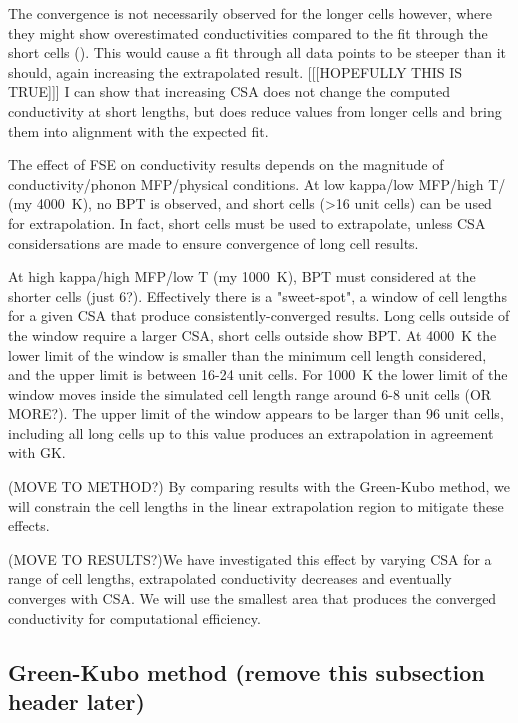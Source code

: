 \documentclass[%
preprint,                                  %
nofootinbib,
 amsmath,amssymb,
 aps,
]{revtex4-1}
\begin{document}
The convergence is not necessarily observed for the longer cells however, where they might show overestimated conductivities compared to the fit through the short cells (\cite{Hu2011}). This would cause a fit through all data points to be steeper than it should, again increasing the extrapolated result.  [[[HOPEFULLY THIS IS TRUE]]] I can show that increasing CSA does not change the computed conductivity at short lengths, but does reduce values from longer cells and bring them into alignment with the expected fit.

The effect of FSE on conductivity results depends on the magnitude of conductivity/phonon MFP/physical conditions. At low kappa/low MFP/high T/ (my 4000~K), no BPT is observed, and short cells (>16 unit cells) can be used for extrapolation. In fact, short cells must be used to extrapolate, unless CSA considersations are made to ensure convergence of long cell results.

At high kappa/high MFP/low T (my 1000~K), BPT must considered at the shorter cells (just 6?). Effectively there is a "sweet-spot", a window of cell lengths for a given CSA that produce consistently-converged results. Long cells outside of the window require a larger CSA, short cells outside show BPT. At 4000~K the lower limit of the window is smaller than the minimum cell length considered, and the upper limit is between 16-24 unit cells. For 1000~K the lower limit of the window moves inside the simulated cell length range around 6-8 unit cells (OR MORE?). The upper limit of the window appears to be larger than 96 unit cells, including all long cells up to this value produces an extrapolation in agreement with GK.




(MOVE TO METHOD?) By comparing results with the Green-Kubo method, we will constrain the cell lengths in the linear extrapolation region to mitigate these effects. 

(MOVE TO RESULTS?)We have investigated this effect by varying CSA for a range of cell lengths, extrapolated conductivity decreases and eventually converges with CSA. We will use the smallest area that produces the converged conductivity for computational efficiency. 









\subsection{\label{sec:theory.gk}Green-Kubo method (remove this subsection header later)}
\end{document}
